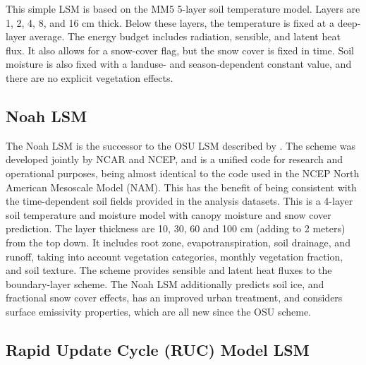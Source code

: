 This simple LSM is based on the MM5 5-layer soil temperature model. Layers are 
1, 2, 4, 8, and 16 cm thick. Below these layers, the temperature is fixed at a
deep-layer average. The energy budget includes radiation, sensible, and 
latent heat flux. It also allows for a snow-cover flag, but the snow 
cover is fixed in time. Soil moisture is also fixed with a landuse- and 
season-dependent constant value, and there are no explicit vegetation effects.

\subsection{Noah LSM}

The Noah LSM is the successor to the OSU LSM described by \citet{chendudhia01}. 
The scheme was developed jointly by NCAR and NCEP, and is a unified
code for research and operational purposes, being almost identical
to the code used in the NCEP North American Mesoscale Model (NAM). This has the benefit of 
being consistent with the time-dependent soil fields provided in the analysis datasets.
This is a 4-layer soil temperature and moisture model with canopy 
moisture and snow cover prediction. The layer thickness are 10, 30, 60 and 100 cm
(adding to 2 meters) from the top down. It includes root zone, evapotranspiration,
soil drainage, and runoff, taking into account vegetation categories,
monthly vegetation fraction, and soil texture. The scheme provides sensible and latent 
heat fluxes to the boundary-layer scheme. The Noah LSM additionally predicts 
soil ice, and fractional snow cover effects, has an improved urban treatment,
and considers surface emissivity properties, which are all new since the OSU
scheme.

\subsection{Rapid Update Cycle (RUC) Model LSM}

